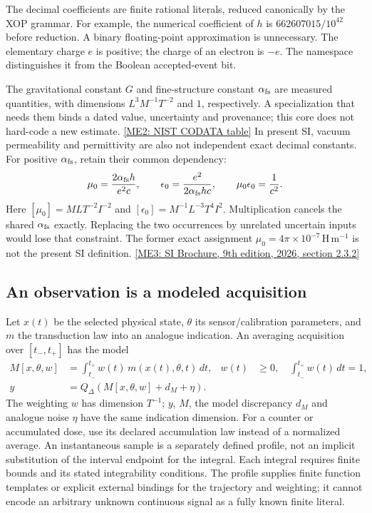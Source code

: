 The decimal coefficients are finite rational literals, reduced canonically by
the XOP grammar. For example, the numerical coefficient of $h$ is
$662607015/10^{42}$ before reduction. A binary floating-point approximation is
unnecessary. The elementary charge $e$ is positive; the charge of an electron
is $-e$. The namespace distinguishes it from the Boolean accepted-event bit.

The gravitational constant $G$ and fine-structure constant $\alpha_{\rm fs}$
are measured quantities, with dimensions $L^3M^{-1}T^{-2}$ and $1$,
respectively. A specialization that needs them binds a dated value, uncertainty
and provenance; this core does not hard-code a new estimate.
\href{https://physics.nist.gov/cuu/Constants/Table/allascii.txt}{[ME2: NIST CODATA table]}
In present SI, vacuum permeability and permittivity are also not independent
exact decimal constants. For positive $\alpha_{\rm fs}$, retain their common
dependency:
\begin{equation}
 \mu_0=\frac{2\alpha_{\rm fs}h}{e^2c},\qquad
 \epsilon_0=\frac{e^2}{2\alpha_{\rm fs}hc},\qquad
 \mu_0\epsilon_0=\frac1{c^2}.
 \label{r13-measurement-vacuum}
\end{equation}
Here $[\mu_0]=MLT^{-2}I^{-2}$ and
$[\epsilon_0]=M^{-1}L^{-3}T^4I^2$. Multiplication cancels the shared
$\alpha_{\rm fs}$ exactly. Replacing the two occurrences by unrelated uncertain
inputs would lose that constraint. The former exact assignment
$\mu_0=4\pi\times10^{-7}\,\mathrm{H\,m^{-1}}$ is not the present SI definition.
\href{https://doi.org/10.59161/AUEZ1291}{[ME3: SI Brochure, 9th edition, 2026, section 2.3.2]}

\subsection{An observation is a modeled acquisition}
\label{r13-measurement-equation}

Let $x(t)$ be the selected physical state, $\theta$ its sensor/calibration
parameters, and $m$ the transduction law into an analogue indication. An
averaging acquisition over $[t_-,t_+]$ has the model
\begin{align}
 M[x,\theta,w]&=\int_{t_-}^{t_+}w(t)\,m(x(t),\theta,t)\,dt,
 &w(t)&\geq0,\quad\int_{t_-}^{t_+}w(t)\,dt=1,\label{r13-measurement-acquisition}\\
 y&=Q_{\Delta}\!\left(M[x,\theta,w]+d_M+\eta\right).
 \label{r13-measurement-observation}
\end{align}
The weighting $w$ has dimension $T^{-1}$; $y$, $M$, the model discrepancy
$d_M$ and analogue noise $\eta$ have the same indication dimension. For a
counter or accumulated dose, use its declared accumulation law instead of a
normalized average. An instantaneous sample is a separately defined profile,
not an implicit substitution of the interval endpoint for the integral.
Each integral requires finite bounds and its stated integrability conditions.
The profile supplies finite function templates or explicit external bindings
for the trajectory and weighting; it cannot encode an arbitrary unknown
continuous signal as a fully known finite literal.

